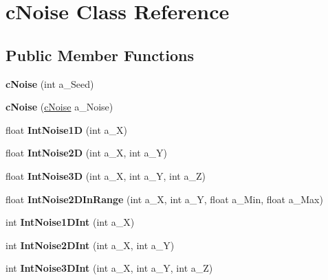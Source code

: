 \hypertarget{classc_noise}{}\section{c\+Noise Class Reference}
\label{classc_noise}
\subsection*{Public Member Functions}
\begin{DoxyCompactItemize}
\item 
\mbox{\label{classc_noise_a44626c294b22756496d6dd0884dd3406}} 
{\bfseries c\+Noise} (int a\+\_\+\+Seed)
\item 
\mbox{\label{classc_noise_adbeed008318f12a15a5d77a50c4d3b2b}} 
{\bfseries c\+Noise} (\hyperlink{classc_noise}{c\+Noise} a\+\_\+\+Noise)
\item 
\mbox{\label{classc_noise_a581a875e1bde532a517c991f820362f2}} 
float {\bfseries Int\+Noise1D} (int a\+\_\+X)
\item 
\mbox{\label{classc_noise_ab49362af952295bfb3a4fa9f8c81422c}} 
float {\bfseries Int\+Noise2D} (int a\+\_\+X, int a\+\_\+Y)
\item 
\mbox{\label{classc_noise_a7215a1f4033f3094c03ce91871c1c93d}} 
float {\bfseries Int\+Noise3D} (int a\+\_\+X, int a\+\_\+Y, int a\+\_\+Z)
\item 
\mbox{\label{classc_noise_aee00ac876258c01fc0240ef2c069e390}} 
float {\bfseries Int\+Noise2\+D\+In\+Range} (int a\+\_\+X, int a\+\_\+Y, float a\+\_\+\+Min, float a\+\_\+\+Max)
\item 
\mbox{\label{classc_noise_a61d066e035ad91a0918893a830209689}} 
int {\bfseries Int\+Noise1\+D\+Int} (int a\+\_\+X)
\item 
\mbox{\label{classc_noise_ac6ed652b35beab6db2ccb2652fd2f408}} 
int {\bfseries Int\+Noise2\+D\+Int} (int a\+\_\+X, int a\+\_\+Y)
\item 
\mbox{\label{classc_noise_a410db77490efe851aa50c0137b9c570d}} 
int {\bfseries Int\+Noise3\+D\+Int} (int a\+\_\+X, int a\+\_\+Y, int a\+\_\+Z)

\end{DoxyCompactItemize}
